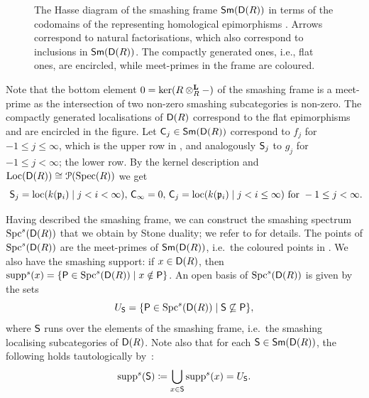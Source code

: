 \documentclass[reqno,a4paper]{amsart}
\begin{document}
\begin{example}
\begin{figure}[h]
\begin{center}
\begin{center}\caption{The Hasse diagram of the smashing frame $\mathsf{Sm}(\mathsf{D}(R))$ in terms of the codomains of the representing homological epimorphisms . Arrows correspond to natural factorisations, which also correspond to inclusions in $\mathsf{Sm}(\mathsf{D}(R))$. The compactly generated ones, i.e., flat ones, are encircled, while meet-primes in the frame are coloured.}\label{fig:smash}\end{center}
\end{center}
\end{figure} 
Note that the bottom element $0=\ker(R\otimes^\mathbf{L}_R-)$ of the smashing frame is a meet-prime as the intersection of two non-zero smashing subcategories is non-zero. The compactly generated localisations of $\mathsf{D}(R)$ correspond to the flat epimorphisms and are encircled in the figure. Let $\mathsf{C}_j\in\mathsf{Sm}(\mathsf{D}(R))$ correspond to $f_j$ for $-1\le j\le \infty$, which is the upper row in , and analogously $\mathsf{S}_j$ to $g_j$ for $-1\le j<\infty$; the lower row.
By the kernel description and $\operatorname{Loc}(\mathsf{D}(R))\cong\operatorname{\mathcal{P}}(\operatorname{Spec}(R))$ we get
\[\
\mathsf{S}_j=\operatorname{loc}(k(\mathfrak{p}_i)\mid j<i<\infty),\,\mathsf{C}_\infty=0,\, \mathsf{C}_j=\operatorname{loc}(k(\mathfrak{p}_i)\mid j<i\le \infty)\mbox{ for }-1\le j<\infty.
\]

Having described the smashing frame, we can construct the smashing spectrum $\operatorname{Spc}^s(\mathsf{D}(R))$ that we obtain by Stone duality; we refer to \cite[\S2.1 and \S3]{bigspectra} for details.
The points of $\operatorname{Spc}^s(\mathsf{D}(R))$ are the meet-primes of $\mathsf{Sm}(\mathsf{D}(R))$, i.e.\ the coloured points in \Cref{fig:smash}.
We also have the smashing support: if $x\in\mathsf{D}(R)$, then $\operatorname{supp}^s(x)=\{\mathsf{P}\in\operatorname{Spc}^s(\mathsf{D}(R)) \mid x\notin\mathsf{P}\}$. An open basis of $\operatorname{Spc}^s(\mathsf{D}(R))$ is given by the sets
\[
U_{\mathsf{S}} = \{ \mathsf{P}\in\operatorname{Spc}^s(\mathsf{D}(R)) \mid \mathsf{S}\not\subseteq\mathsf{P} \},
\]
where $\mathsf{S}$ runs over the elements of the smashing frame, i.e.\ the smashing localising subcategories of $\mathsf{D}(R)$. Note also that for each $\mathsf{S}\in\mathsf{Sm}(\mathsf{D}(R))$, the following holds tautologically by~\cite[Remark~3.2.5]{bigspectra}:
\[ \operatorname{supp}^s(\mathsf{S}) \coloneqq \bigcup_{x\in\mathsf{S}}\operatorname{supp}^s(x) = U_{\mathsf{S}}. \]


\end{example}
\end{document}
